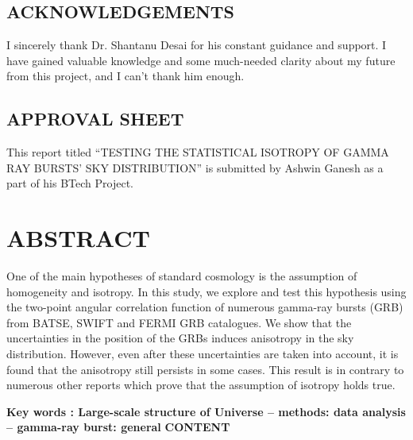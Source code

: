 \documentclass[12pt]{article}
\begin{document}
\clearpage

\hfill \break
\hfill \break
\hfill \break
\hfill \break
\hfill \break
\hfill \break
\hfill \break
\begin{center}
    \section{ACKNOWLEDGEMENTS
}
{\large I sincerely thank Dr. Shantanu Desai for his constant guidance and
support. I have gained valuable knowledge and some much-needed clarity about my future from this project, and I can't thank him enough.}
\end{center}
\newpage


\hfill \break
\hfill \break
\hfill \break
\hfill \break
\hfill \break
\hfill \break
\hfill \break
\begin{center}
    \section{APPROVAL SHEET}

{\large This report titled ``TESTING THE STATISTICAL ISOTROPY OF GAMMA RAY
BURSTS' SKY DISTRIBUTION'' is submitted by Ashwin Ganesh as a part of his BTech Project.}
\end{center}
\newpage


\hfill \break
\hfill \break
\hfill \break
\hfill \break
\hfill \break
\hfill \break
\hfill \break
\section{ABSTRACT}


One of the main hypotheses of standard cosmology is the assumption of
homogeneity and isotropy. In this study, we explore and test this
hypothesis using the two-point angular correlation function of numerous
gamma-ray bursts (GRB) from BATSE, SWIFT and FERMI GRB catalogues. We
show that the uncertainties in the position of the GRBs induces
anisotropy in the sky distribution. However, even after these
uncertainties are taken into account, it is found that the anisotropy
still persists in some cases. This result is in contrary to numerous
other reports which prove that the assumption of isotropy holds true.\cite{andrade2019revisiting}

\textbf{Key words : Large-scale structure of Universe – methods: data analysis – gamma-ray burst: general}
\newpage
{\Large\textbf{CONTENT}}
\end{document}
